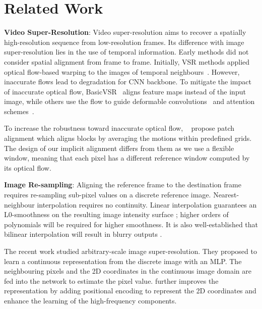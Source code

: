 \documentclass[10pt,twocolumn,letterpaper]{article}
\begin{document}
\section{Related Work}
\label{sec:related_work}

\textbf{Video Super-Resolution}:
Video super-resolution aims to recover a spatially high-resolution sequence from low-resolution frames. Its difference with image super-resolution lies in the use of temporal information. Early methods \cite{huang2017video, fuoli2019efficient, isobe2020video, isobe2020revisiting} did not consider spatial alignment from frame to frame.  Initially, VSR methods applied optical flow-based warping to the images of temporal neighbours~\cite{kim2018spatio, xue2019video_tof}.  However, inaccurate flows lead to degradation for CNN backbone.
To mitigate the impact of inaccurate optical flow, BasicVSR~\cite{chan2021basicvsr} aligns feature maps instead of the input image, while others use the flow to guide deformable convolutions~\cite{wang2019edvr, chan2022basicvsrpp, liang2022vrt_vrt} and attention schemes~\cite{liang2022recurrent_rvrt}. 


To increase the robustness toward inaccurate optical flow, ~\cite{shi2022rethinking} propose patch alignment which aligns blocks by averaging the motions within predefined grids. The design of our implicit alignment differs from them as we use a flexible window, meaning that each pixel has a different reference window computed by its optical flow. 


\textbf{Image Re-sampling}:
 Aligning the reference frame to the destination frame requires re-sampling sub-pixel values on a discrete reference image.  
 Nearest-neighbour interpolation requires no continuity.  Linear interpolation guarantees an L0-smoothness on the resulting image intensity surface \cite{dodgson1992image}; higher orders of polynomials will be required for higher smoothness. It is also well-established that bilinear interpolation will result in blurry outputs \cite{wolberg1990digital}. 

 The recent work \cite{chen2021learning_liif} studied arbitrary-scale image super-resolution.  They proposed to learn a continuous representation from the discrete image with an MLP.  The neighbouring pixels and the 2D coordinates in the continuous image domain are fed into the network to estimate the pixel value. \cite{xu2021ultrasr} further improves the representation by adding positional encoding to represent the 2D coordinates and enhance the learning of the high-frequency components.
\end{document}
